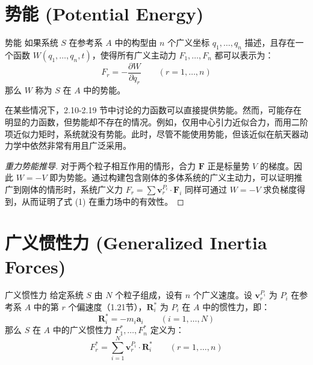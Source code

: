 \section{势能 (Potential Energy)}

\begin{mydefinition}{势能}
如果系统 \(S\) 在参考系 \(A\) 中的构型由 \(n\) 个广义坐标 \(q_1,\dots,q_n\) 描述，且存在一个函数 \(W(q_1,\dots,q_n,t)\)，使得所有广义主动力 \(F_1,\dots,F_n\) 都可以表示为：
\begin{equation}
F_r = -\frac{\partial W}{\partial q_r} \qquad (r=1,\dots,n) \tag{1}
\end{equation}
那么 \(W\) 称为 \(S\) 在 \(A\) 中的势能。
\end{mydefinition}

在某些情况下，2.10-2.19 节中讨论的力函数可以直接提供势能。然而，可能存在明显的力函数，但势能却不存在的情况。例如，仅用中心引力近似合力，而用二阶项近似力矩时，系统就没有势能。此时，尽管不能使用势能，但该近似在航天器动力学中依然非常有用且广泛采用。

\begin{proof}[重力势能推导]
对于两个粒子相互作用的情形，合力 \(\mathbf{F}\) 正是标量势 \(V\) 的梯度。因此 \(W = -V\) 即为势能。通过构建包含刚体的多体系统的广义主动力，可以证明推广到刚体的情形时，系统广义力 \(F_r = \sum \mathbf{v}_r^{P_i} \cdot \mathbf{F}_i\) 同样可通过 \(W = -V\) 求负梯度得到，从而证明了式 (1) 在重力场中的有效性。
\end{proof}

\section{广义惯性力 (Generalized Inertia Forces)}

\begin{mydefinition}{广义惯性力}
给定系统 \(S\) 由 \(N\) 个粒子组成，设有 \(n\) 个广义速度。设 \(\mathbf{v}_r^{P_i}\) 为 \(P_i\) 在参考系 \(A\) 中的第 \(r\) 个偏速度（1.21节），\(\mathbf{R}_i^*\) 为 \(P_i\) 在 \(A\) 中的惯性力，即：
\begin{equation}
\mathbf{R}_i^* = -m_i \mathbf{a}_i \qquad (i=1,\dots,N) \tag{1}
\end{equation}
那么 \(S\) 在 \(A\) 中的广义惯性力 \(F_1^*, \dots, F_n^*\) 定义为：
\begin{equation}
F_r^* = \sum_{i=1}^N \mathbf{v}_r^{P_i} \cdot \mathbf{R}_i^* \qquad (r=1,\dots,n) \tag{2}
\end{equation}
\end{mydefinition}

